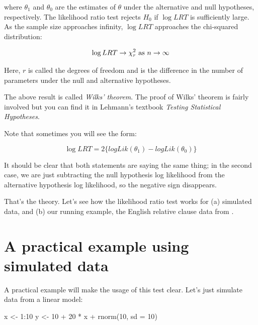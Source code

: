 \documentclass[
  12pt,
]{krantz}
\newenvironment{Shaded}{\begin{snugshade}}{\end{snugshade}}
\newcommand{\AttributeTok}[1]{\textcolor[rgb]{0.77,0.63,0.00}{#1}}
\newcommand{\DecValTok}[1]{\textcolor[rgb]{0.00,0.00,0.81}{#1}}
\newcommand{\FunctionTok}[1]{\textcolor[rgb]{0.00,0.00,0.00}{#1}}
\newcommand{\NormalTok}[1]{#1}
\newcommand{\OtherTok}[1]{\textcolor[rgb]{0.56,0.35,0.01}{#1}}
\newcommand{\SpecialCharTok}[1]{\textcolor[rgb]{0.00,0.00,0.00}{#1}}
\theoremstyle{definition}
\theoremstyle{definition}
\theoremstyle{definition}
\theoremstyle{definition}
\theoremstyle{remark}
\begin{document}
where \(\theta_1\) and \(\theta_0\) are the estimates of \(\theta\) under the alternative and null hypotheses, respectively. The likelihood ratio test rejects \(H_0\) if \(\log LRT\) is sufficiently large. As the sample size approaches infinity, \(\log LRT\) approaches the chi-squared distribution:

\begin{equation}
\log LRT \rightarrow \chi_r^2  \hbox{ as }  n \rightarrow \infty
\end{equation}

Here, \(r\) is called the degrees of freedom and is the difference in the number of parameters under the null and alternative hypotheses.

The above result is called \emph{Wilks' theorem}. The proof of Wilks' theorem is fairly involved but you can find it in Lehmann's textbook \emph{Testing Statistical Hypotheses}.

Note that sometimes you will see the form:

\begin{equation}
 \log LRT = 2 \{logLik(\theta_1) - logLik(\theta_0)\}
\end{equation}

It should be clear that both statements are saying the same thing; in the second case, we are just subtracting the null hypothesis log likelihood from the alternative hypothesis log likelihood, so the negative sign disappears.

That's the theory. Let's see how the likelihood ratio test works for (a) simulated data, and (b) our running example, the English relative clause data from \citet{grodner}.

\hypertarget{a-practical-example-using-simulated-data}{%
\section{A practical example using simulated data}\label{a-practical-example-using-simulated-data}}

A practical example will make the usage of this test clear.
Let's just simulate data from a linear model:

\begin{Shaded}
\begin{Highlighting}[]
\NormalTok{x }\OtherTok{\textless{}{-}} \DecValTok{1}\SpecialCharTok{:}\DecValTok{10}
\NormalTok{y }\OtherTok{\textless{}{-}} \DecValTok{10} \SpecialCharTok{+} \DecValTok{20} \SpecialCharTok{*}\NormalTok{ x }\SpecialCharTok{+} \FunctionTok{rnorm}\NormalTok{(}\DecValTok{10}\NormalTok{, }\AttributeTok{sd =} \DecValTok{10}\NormalTok{)}
\end{Highlighting}
\end{Shaded}
\end{document}
